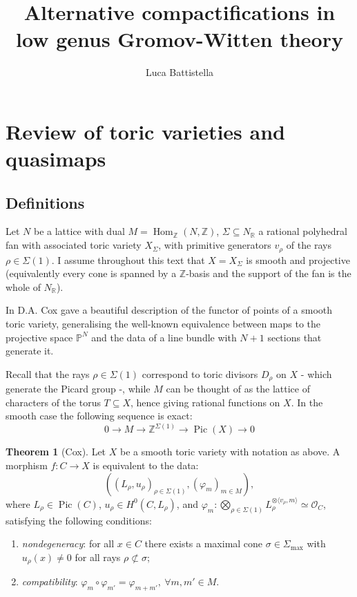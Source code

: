 \documentclass[11pt]{amsart}
\title[Thesis]{Alternative compactifications in low genus Gromov-Witten theory}
\author{Luca Battistella}
\newcommand{\PP}{\mathbb P}
\newcommand{\Z}{\mathbb{Z}}
\newcommand{\OO}{\mathcal{O}}
\renewcommand{\to}{\rightarrow}
\newcommand{\Pic}{\operatorname{Pic}}
\newcommand{\Hom}{\operatorname{Hom}}
\newcommand{\ZZ}{\mathbb{Z}}
\newcommand{\RR}{\mathbb{R}}
\theoremstyle{definition}
\newtheorem{thm}{Theorem}[section]
\theoremstyle{definition}
\newcommand{\ilemph}[1]{\emph{#1}}
\begin{document}
\maketitle
\appendixtitletocoff
\tableofcontents

\section{Review of toric varieties and quasimaps}

\subsection{Definitions} Let $N$ be a lattice with dual $M=\Hom_{\ZZ}(N,\ZZ)$, $\Sigma\subseteq N_{\RR}$ a rational polyhedral fan with associated toric variety $X_{\Sigma}$, with primitive generators $v_{\rho}$ of the rays $\rho\in\Sigma(1)$. I assume throughout this text that $X=X_{\Sigma}$ is smooth and projective (equivalently every cone is spanned by a $\Z$-basis and the support of the fan is the whole of $N_{\RR}$).

In \cite{CoxFunctor} D.A. Cox gave a beautiful description of the functor of points of a smooth toric variety, generalising the well-known equivalence between maps to the projective space $\PP^N$ and the data of a line bundle with $N+1$ sections that generate it.

Recall that the rays $\rho\in\Sigma(1)$ correspond to toric divisors $D_{\rho}$ on $X$ - which generate the Picard group -, while $M$ can be thought of as the lattice of characters of the torus $T\subseteq X$, hence giving rational functions on $X$. In the smooth case the following sequence is exact:
\begin{equation}\label{eq:toric_Pic_es} 0\to M\to \ZZ^{\Sigma(1)}\to \Pic(X)\to 0\end{equation}

\begin{thm}[Cox]
 Let $X$ be a smooth toric variety with notation as above. A morphism $f\colon C\to X$ is equivalent to the data:
 \[\left((L_\rho,u_\rho)_{\rho\in\Sigma(1)},(\varphi_m)_{m\in M}\right),\]
 where $L_\rho\in\Pic(C)$, $u_\rho\in H^0(C,L_\rho)$, and $\varphi_m\colon \bigotimes_{\rho\in\Sigma(1)}L_\rho^{\otimes \langle v_\rho, m\rangle}\simeq \OO_C$, satisfying the following conditions:
 \begin{enumerate}
\item \ilemph{nondegeneracy}: for all $x \in C$ there exists a maximal cone $\sigma \in \Sigma_{\operatorname{max}}$ with $u_\rho(x) \neq 0$ for all rays $\rho \not\subset \sigma$;
\item \ilemph{compatibility}: $\varphi_m\circ\varphi_{m'}=\varphi_{m+m'},\ \forall m,m'\in M$.
\end{enumerate}
\end{thm}
\end{document}
